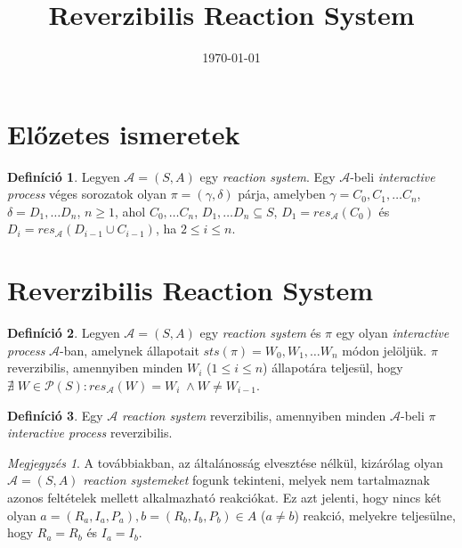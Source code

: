 \documentclass[12pt]{article}
\title{Reverzibilis Reaction System}
\date{\today}
\theoremstyle{definition}
\newtheorem*{definition*}{Definíció}
\theoremstyle{remark}
\newtheorem*{remark*}{Megjegyzés}
\theoremstyle{plain}
\begin{document}
    \maketitle

    \section*{Előzetes ismeretek}

    \begin{definition*}
        Legyen $\mathscr{A} = (S, A)$ egy \textit{reaction system}. Egy $\mathscr{A}$-beli \textit{interactive process} véges sorozatok olyan $\pi = (\gamma, \delta)$ párja, amelyben $\gamma = C_{0}, C_{1}, \ldots C_{n}$, $\delta = D_{1}, \ldots D_{n}$, $n \geq 1$, ahol $C_{0}, \ldots C_{n}$, $D_{1}, \ldots D_{n} \subseteq S$, $D_{1} = \textit{res}_{\mathscr{A}}(C_{0})$ és $D_{i} = \textit{res}_{\mathscr{A}}(D_{i - 1} \cup C_{i - 1})$, ha $2 \leq i \leq n$.
    \end{definition*}

    \section*{Reverzibilis Reaction System}

    \begin{definition*}
        Legyen $\mathscr{A} = (S, A)$ egy \textit{reaction system} és $\pi$ egy olyan \textit{interactive process} $\mathscr{A}$-ban, amelynek állapotait $\textit{sts}(\pi)=W_{0},W_{1},\ldots W_{n}$ módon jelöljük. $\pi$ reverzibilis, amennyiben minden $W_{i}$ ($1 \leq i \leq n$) állapotára teljesül, hogy $\nexists \; W \in \mathcal{P}(S) : res_{\mathscr{A}}(W) = W_{i} \; \wedge W \neq W_{i - 1}$.
    \end{definition*}

    \begin{definition*}
        Egy $\mathscr{A}$ \textit{reaction system} reverzibilis, amennyiben minden $\mathscr{A}$-beli $\pi$ \textit{interactive process} reverzibilis.
    \end{definition*}

    \begin{remark*}
        A továbbiakban, az általánosság elvesztése nélkül, kizárólag olyan $\mathscr{A} = (S, A)$ \textit{reaction systemeket} fogunk tekinteni, melyek nem tartalmaznak azonos feltételek mellett alkalmazható reakciókat. Ez azt jelenti, hogy nincs két olyan $a = (R_{a}, I_{a}, P_{a}), b = (R_{b}, I_{b}, P_{b}) \in A$ ($a \neq b$) reakció, melyekre teljesülne, hogy $R_{a} = R_{b}$ és $I_{a} = I_{b}$.
    \end{remark*}
\end{document}
